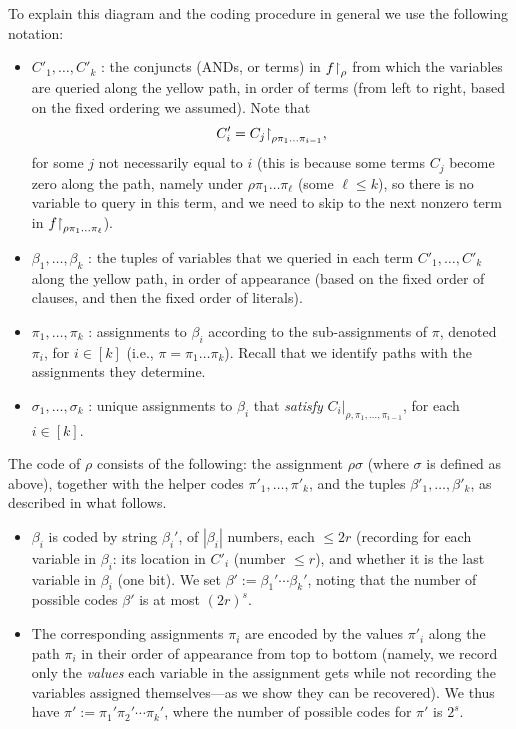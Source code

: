 To explain this diagram  and the coding procedure in general we use the following notation:
\begin{itemize}
    \item \( C'_1, \dots, C'_k \) : the conjuncts (ANDs, or terms) in $f{\upharpoonright}_\rho$ from which the variables are queried along the yellow path, in order of terms (from left to right, based on the fixed ordering we assumed). Note that 
$$C'_i = C_j{\upharpoonright}_{\rho\pi_1\dots\pi_{i-1}},$$
 for some $j$ not necessarily equal to $i$ (this is because some terms $C_j$ become zero along the path, namely under $\rho\pi_1\dots\pi_{\ell}$ (some $\ell \le k$), so there is no variable to query in this term, and we need to skip to the next nonzero term in $f{\upharpoonright}_{\rho\pi_1\dots\pi_{\ell}}$). 
    \item \( \beta_1, \dots, \beta_k \) : the tuples of variables that we queried in each term $C'_1,\dots,C'_k$  along the yellow path, in order of appearance (based on the fixed order of clauses, and then the fixed order of literals).
  
    \item \( \pi_1, \dots, \pi_k \) : assignments to \( \beta_i \) according to the sub-assignments of $\pi$, denoted \( \pi_i \), for $i\in[k]$ (i.e.,  $ \pi=\pi_1 \dots \pi_k $).
Recall that we identify paths with the assignments they determine.

    \item \( \sigma_1, \dots, \sigma_k \) : unique assignments to \( \beta_i \) that \emph{satisfy}  \( C_i |_{\rho, \pi_1, \dots, \pi_{i-1}} \), for each $i\in[k]$.
\end{itemize}

\begin{tcolorbox}[colframe=white, colback=blue!4, boxrule=0mm, sharp corners]
The code of $\rho$ consists of the following: the assignment $\rho\sigma$ (where $\sigma$ is defined as above), together with the helper codes $\pi'_1,\dots,\pi'_k $, and the tuples $\beta'_1,\dots,\beta'_k$, as described in what follows.
\end{tcolorbox}


\begin{itemize}
    \item \( \beta_i \) is coded by string \( \beta_i' \), of \( |\beta_i| \) numbers, each \( \leq 2r \) (recording for each variable in \( \beta_i \): its location in \( C'_i \) (number \( \leq r \)), and whether it is the last variable in \( \beta_i \) (one bit).
We set  \( \beta' := \beta_1' \cdots \beta_k' \), noting  that the number of possible codes $\beta'$ is at most $ (2r)^s $.
    \item The corresponding assignments \( \pi_i \) are encoded by the values $\pi'_i$ along the path $\pi_i$ in their order of appearance from top to bottom (namely, we record only the \emph{values} each variable in the assignment gets while not recording the variables assigned themselves---as we show they can be recovered).
We thus have  \( \pi' := \pi_1' \pi_2' \cdots \pi_k' \), where the number of possible codes for \( \pi' \) is \( 2^s \). 
\end{itemize}



